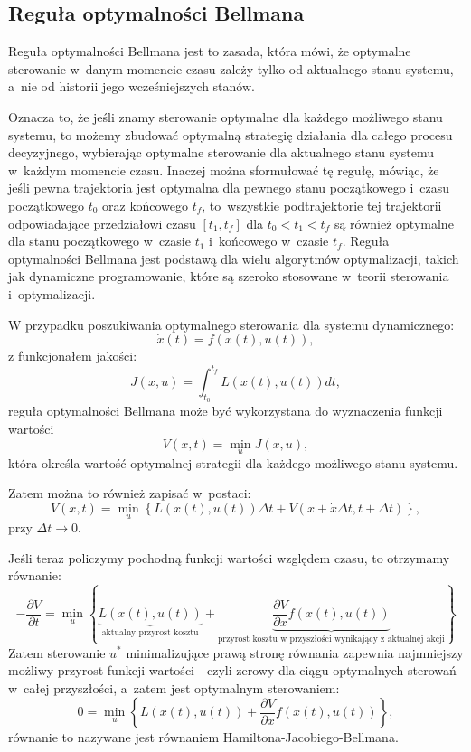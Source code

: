 \documentclass{article}
\begin{document}
    \subsection{Reguła optymalności Bellmana}
    Reguła optymalności Bellmana jest to zasada, która mówi,
    że optymalne sterowanie w~danym momencie czasu
    zależy tylko od aktualnego stanu systemu, a~nie od historii
    jego wcześniejszych stanów.

    Oznacza to, że jeśli znamy sterowanie optymalne dla
    każdego możliwego stanu systemu, to możemy zbudować optymalną
    strategię działania dla całego procesu decyzyjnego, wybierając
    optymalne sterowanie dla aktualnego stanu systemu w~każdym
    momencie czasu.
    Inaczej można sformułować tę regułę, mówiąc, że jeśli pewna 
    trajektoria jest optymalna dla pewnego stanu początkowego i~czasu 
    początkowego $t_0$ oraz końcowego $t_f$, to~wszystkie podtrajektorie
    tej trajektorii odpowiadające przedziałowi czasu $[t_1, t_f]$
    dla $t_0 < t_1 < t_f$ są również optymalne dla stanu początkowego
    w~czasie $t_1$ i~końcowego w~czasie $t_f$.
    Reguła optymalności Bellmana jest podstawą dla wielu algorytmów
    optymalizacji, takich jak dynamiczne programowanie, które są
    szeroko stosowane w~teorii sterowania i~optymalizacji.

    W przypadku poszukiwania optymalnego sterowania dla systemu dynamicznego:
    \[
        \dot{x}(t) = f(x(t), u(t)),
    \]
    z funkcjonałem jakości:
    \[
        J(x,u) = \int_{t_0}^{t_f}{L(x(t), u(t))dt},
    \]
    reguła optymalności Bellmana może być wykorzystana do wyznaczenia
    funkcji wartości
    \[
        V(x,t) = \min_{u} J(x,u),
    \]
    która określa wartość optymalnej strategii dla każdego możliwego
    stanu systemu.

    Zatem można to również zapisać w~postaci:
    \[
        V(x,t) = \min_{u}\left\{
            L(x(t), u(t))\Delta t  + V(x+\dot{x}\Delta t,t+\Delta t) \right\},
    \]
    przy $\Delta t \to 0$.

    Jeśli teraz policzymy pochodną funkcji wartości względem czasu,
    to otrzymamy równanie:
    \[
        -\frac{\partial V}{\partial t} = \min_{u} \left\{ 
            \underbrace{L(x(t), u(t))}_{\text{aktualny przyrost kosztu}}
            +
            \underbrace{\frac{\partial V}{\partial x} f(x(t), u(t))}_{\text{przyrost kosztu w przyszłości wynikający z aktualnej akcji}} \right\}
    \]
    Zatem sterowanie $u^{*}$ minimalizujące prawą stronę równania
    zapewnia najmniejszy możliwy przyrost funkcji wartości - czyli zerowy dla
    ciągu optymalnych sterowań w~całej przyszłości, a~zatem
    jest optymalnym sterowaniem:
    \begin{equation}
        \label{eq:hjb}
        0 = \min_{u} \left\{ 
            L(x(t), u(t))
            +
            \frac{\partial V}{\partial x} f(x(t), u(t))
            \right\},
    \end{equation}
    równanie to nazywane jest równaniem Hamiltona-Jacobiego-Bellmana.
\end{document}

